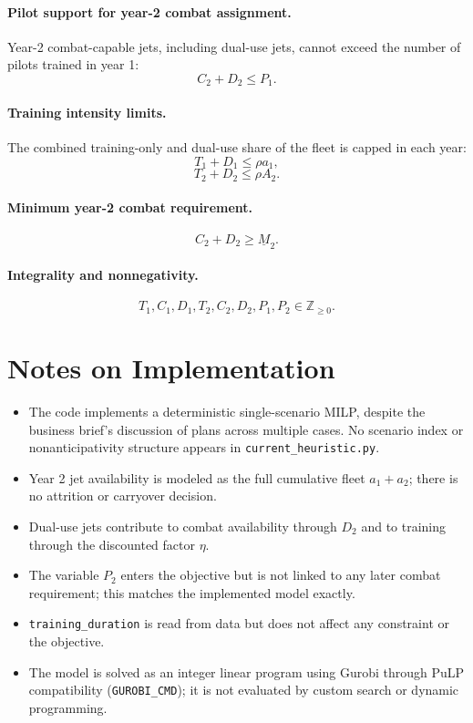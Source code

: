 \paragraph{Pilot support for year-2 combat assignment.}
Year-2 combat-capable jets, including dual-use jets, cannot exceed the number of pilots trained in year 1:
\[
C_2 + D_2 \le P_1.
\]

\paragraph{Training intensity limits.}
The combined training-only and dual-use share of the fleet is capped in each year:
\[
T_1 + D_1 \le \rho a_1,
\]
\[
T_2 + D_2 \le \rho A_2.
\]

\paragraph{Minimum year-2 combat requirement.}
\[
C_2 + D_2 \ge \underline{M}_2.
\]

\paragraph{Integrality and nonnegativity.}
\[
T_1,C_1,D_1,T_2,C_2,D_2,P_1,P_2 \in \mathbb{Z}_{\ge 0}.
\]

\section*{Notes on Implementation}

\begin{itemize}
    \item The code implements a deterministic single-scenario MILP, despite the business brief's discussion of plans across multiple cases. No scenario index or nonanticipativity structure appears in \texttt{current\_heuristic.py}.
    \item Year 2 jet availability is modeled as the full cumulative fleet $a_1+a_2$; there is no attrition or carryover decision.
    \item Dual-use jets contribute to combat availability through $D_2$ and to training through the discounted factor $\eta$.
    \item The variable $P_2$ enters the objective but is not linked to any later combat requirement; this matches the implemented model exactly.
    \item \texttt{training\_duration} is read from data but does not affect any constraint or the objective.
    \item The model is solved as an integer linear program using Gurobi through PuLP compatibility (\texttt{GUROBI\_CMD}); it is not evaluated by custom search or dynamic programming.
\end{itemize}
